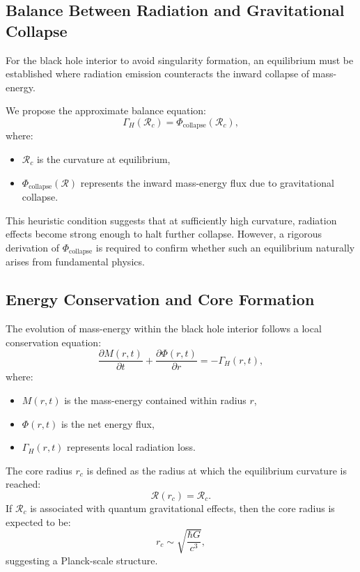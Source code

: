 \subsection{Balance Between Radiation and Gravitational Collapse}

For the black hole interior to avoid singularity formation, an equilibrium must be established where radiation emission counteracts the inward collapse of mass-energy.

We propose the approximate balance equation:
\begin{equation}
    \Gamma_H(\mathcal{R}_c) = \Phi_{\text{collapse}}(\mathcal{R}_c),
\end{equation}
where:
\begin{itemize}
    \item \( \mathcal{R}_c \) is the curvature at equilibrium,
    \item \( \Phi_{\text{collapse}}(\mathcal{R}) \) represents the inward mass-energy flux due to gravitational collapse.
\end{itemize}

This heuristic condition suggests that at sufficiently high curvature, radiation effects become strong enough to halt further collapse. However, a rigorous derivation of \( \Phi_{\text{collapse}} \) is required to confirm whether such an equilibrium naturally arises from fundamental physics.

\subsection{Energy Conservation and Core Formation}

The evolution of mass-energy within the black hole interior follows a local conservation equation:
\begin{equation}
    \frac{\partial M(r, t)}{\partial t} + \frac{\partial \Phi(r,t)}{\partial r} = -\Gamma_H(r, t),
\end{equation}
where:
\begin{itemize}
    \item \( M(r,t) \) is the mass-energy contained within radius \( r \),
    \item \( \Phi(r,t) \) is the net energy flux,
    \item \( \Gamma_H(r,t) \) represents local radiation loss.
\end{itemize}

The core radius \( r_c \) is defined as the radius at which the equilibrium curvature is reached:
\begin{equation}
    \mathcal{R}(r_c) = \mathcal{R}_c.
\end{equation}
If \( \mathcal{R}_c \) is associated with quantum gravitational effects, then the core radius is expected to be:
\begin{equation}
    r_c \sim \sqrt{\frac{\hbar G}{c^3}},
\end{equation}
suggesting a Planck-scale structure.

